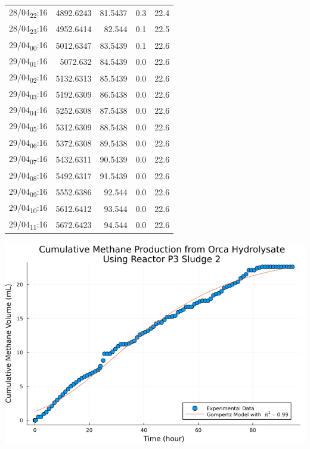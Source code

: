 \documentclass[11pt]{article}
\begin{document}
\begin{table}[htbp]
\begin{tabular}{lrrrr}
28/04\textsubscript{22}:16 & 4892.6243 & 81.5437 & 0.3 & 22.4\\[0pt]
28/04\textsubscript{23}:16 & 4952.6414 & 82.544 & 0.1 & 22.5\\[0pt]
29/04\textsubscript{00}:16 & 5012.6347 & 83.5439 & 0.1 & 22.6\\[0pt]
29/04\textsubscript{01}:16 & 5072.632 & 84.5439 & 0.0 & 22.6\\[0pt]
29/04\textsubscript{02}:16 & 5132.6313 & 85.5439 & 0.0 & 22.6\\[0pt]
29/04\textsubscript{03}:16 & 5192.6309 & 86.5438 & 0.0 & 22.6\\[0pt]
29/04\textsubscript{04}:16 & 5252.6308 & 87.5438 & 0.0 & 22.6\\[0pt]
29/04\textsubscript{05}:16 & 5312.6309 & 88.5438 & 0.0 & 22.6\\[0pt]
29/04\textsubscript{06}:16 & 5372.6308 & 89.5438 & 0.0 & 22.6\\[0pt]
29/04\textsubscript{07}:16 & 5432.6311 & 90.5439 & 0.0 & 22.6\\[0pt]
29/04\textsubscript{08}:16 & 5492.6317 & 91.5439 & 0.0 & 22.6\\[0pt]
29/04\textsubscript{09}:16 & 5552.6386 & 92.544 & 0.0 & 22.6\\[0pt]
29/04\textsubscript{10}:16 & 5612.6412 & 93.544 & 0.0 & 22.6\\[0pt]
29/04\textsubscript{11}:16 & 5672.6423 & 94.544 & 0.0 & 22.6\\[0pt]
\end{tabular}
\end{table}

\begin{center}
\includegraphics[width=.9\linewidth]{../plots/BMPs/Orca Hydrolysate/methane_kinetics_orca_p3_s2_hour.png}
\end{center}
\end{document}
